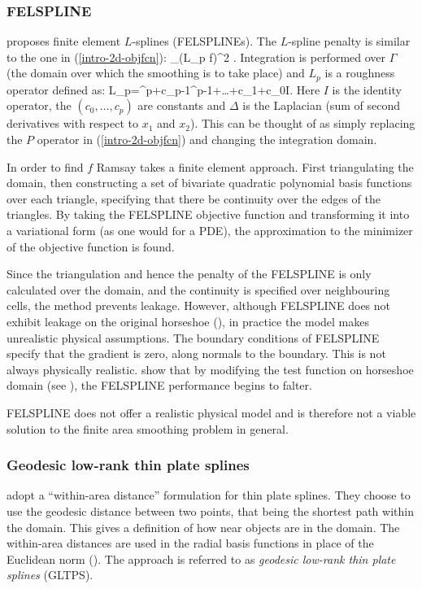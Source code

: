 \subsubsection{FELSPLINE}

 proposes finite element $L$-splines (FELSPLINEs). The $L$-spline penalty is similar to the one in (\ref{intro-2d-objfcn}):
\be
\int_\Gamma (L_p f)^2 .
\ee
Integration is performed over $\Gamma$ (the domain over which the smoothing is to take place) and $L_p$ is a roughness operator defined as:
\be
L_p=\Delta^p+c_{p-1}\Delta^{p-1}+\dots+c_1\Delta+c_0I.
\ee
Here $I$ is the identity operator, the $(c_0,\dots, c_p)$ are constants and $\Delta$ is the Laplacian (sum of second derivatives with respect to $x_1$ and $x_2$). This can be thought of as simply replacing the $P$ operator in (\ref{intro-2d-objfcn}) and changing the integration domain. 

In order to find $f$ Ramsay takes a finite element approach. First triangulating the domain, then constructing a set of bivariate quadratic polynomial basis functions over each triangle, specifying that there be continuity over the edges of the triangles. By taking the FELSPLINE objective function and transforming it into a variational form (as one would for a PDE), the approximation to the minimizer of the objective function is found.

Since the triangulation and hence the penalty of the FELSPLINE is only calculated over the domain, and the continuity is specified over neighbouring cells, the method prevents leakage. However, although FELSPLINE does not exhibit leakage on the original horseshoe (), in practice the model makes unrealistic physical assumptions. The boundary conditions of FELSPLINE specify that the gradient is zero, along normals to the boundary. This is not always physically realistic.  show that by modifying the test function on horseshoe domain (see ), the FELSPLINE performance begins to falter.

FELSPLINE does not offer a realistic physical model and is therefore not a viable solution to the finite area smoothing problem in general.

\subsubsection{Geodesic low-rank thin plate splines}

 adopt a ``within-area distance'' formulation for thin plate splines. They choose to use the geodesic distance between two points, that being the shortest path within the domain. This gives a definition of how near objects are in the domain. The within-area distances are used in the radial basis functions in place of the Euclidean norm (). The approach is referred to as \textit{geodesic low-rank thin plate splines} (GLTPS).

